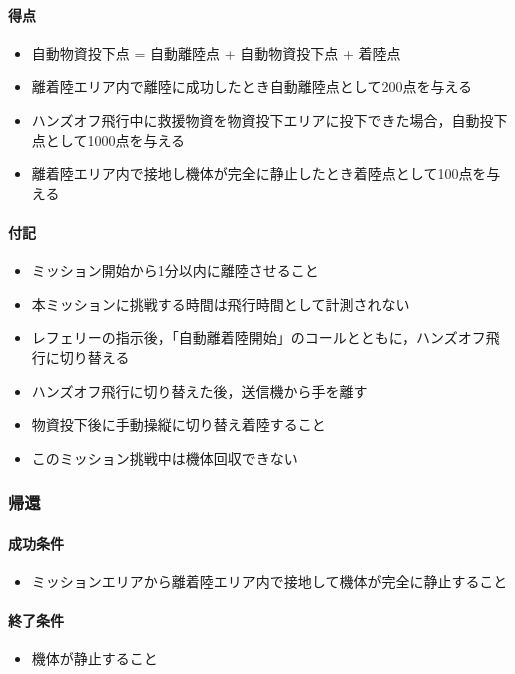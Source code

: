 \paragraph{得点}
\begin{itemize}
  \item 自動物資投下点 = 自動離陸点 + 自動物資投下点 + 着陸点
  \item 離着陸エリア内で離陸に成功したとき自動離陸点として200点を与える
  \item ハンズオフ飛行中に救援物資を物資投下エリアに投下できた場合，自動投下点として1000点を与える
  \item 離着陸エリア内で接地し機体が完全に静止したとき着陸点として100点を与える
\end{itemize}
\paragraph{付記}
\begin{itemize}
  \item ミッション開始から1分以内に離陸させること
  \item 本ミッションに挑戦する時間は飛行時間として計測されない
  \item レフェリーの指示後，「自動離着陸開始」のコールとともに，ハンズオフ飛行に切り替える
  \item ハンズオフ飛行に切り替えた後，送信機から手を離す
  \item 物資投下後に手動操縦に切り替え着陸すること
  \item このミッション挑戦中は機体回収できない
\end{itemize}

\subsubsection{帰還}
\paragraph{成功条件}
\begin{itemize}
\item ミッションエリアから離着陸エリア内で接地して機体が完全に静止すること
\end{itemize}
\paragraph{終了条件}
\begin{itemize}
\item 機体が静止すること
\end{itemize}
